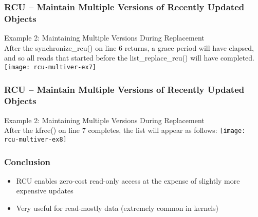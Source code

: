\begin{frame}[fragile]
    \frametitle{RCU -- Maintain Multiple Versions of Recently Updated Objects}
    \large
    Example 2: Maintaining Multiple Versions During Replacement \\
    
After the synchronize\_rcu() on line 6 returns, a grace period will have elapsed, and so all reads that started before the list\_replace\_rcu() will have completed.
    \texttt{[image: rcu-multiver-ex7]}
\end{frame}

\begin{frame}[fragile]
    \frametitle{RCU -- Maintain Multiple Versions of Recently Updated Objects}
    \large
    Example 2: Maintaining Multiple Versions During Replacement \\
    
    After the kfree() on line 7 completes, the list will appear as follows: 
    \texttt{[image: rcu-multiver-ex8]}
\end{frame}

\begin{frame}[fragile]
    \frametitle{Conclusion}
    \Large
    \begin{itemize}
    \item RCU enables zero-cost read-only access at the
    expense of slightly more expensive updates
    \item Very useful for read-mostly data (extremely common in
    kernels)
\end{itemize}
\end{frame}

